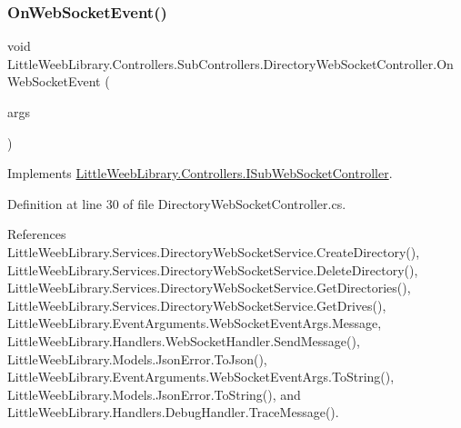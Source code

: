 \subsubsection{\texorpdfstring{On\+Web\+Socket\+Event()}{OnWebSocketEvent()}}
{\footnotesize\ttfamily void Little\+Weeb\+Library.\+Controllers.\+Sub\+Controllers.\+Directory\+Web\+Socket\+Controller.\+On\+Web\+Socket\+Event (\begin{DoxyParamCaption}\item[{\mbox{\hyperlink{class_little_weeb_library_1_1_event_arguments_1_1_web_socket_event_args}{Web\+Socket\+Event\+Args}}}]{args }\end{DoxyParamCaption})}



Implements \mbox{\hyperlink{interface_little_weeb_library_1_1_controllers_1_1_i_sub_web_socket_controller_adcb26b7b397d6a67ccbf114008c29985}{Little\+Weeb\+Library.\+Controllers.\+I\+Sub\+Web\+Socket\+Controller}}.



Definition at line 30 of file Directory\+Web\+Socket\+Controller.\+cs.



References Little\+Weeb\+Library.\+Services.\+Directory\+Web\+Socket\+Service.\+Create\+Directory(), Little\+Weeb\+Library.\+Services.\+Directory\+Web\+Socket\+Service.\+Delete\+Directory(), Little\+Weeb\+Library.\+Services.\+Directory\+Web\+Socket\+Service.\+Get\+Directories(), Little\+Weeb\+Library.\+Services.\+Directory\+Web\+Socket\+Service.\+Get\+Drives(), Little\+Weeb\+Library.\+Event\+Arguments.\+Web\+Socket\+Event\+Args.\+Message, Little\+Weeb\+Library.\+Handlers.\+Web\+Socket\+Handler.\+Send\+Message(), Little\+Weeb\+Library.\+Models.\+Json\+Error.\+To\+Json(), Little\+Weeb\+Library.\+Event\+Arguments.\+Web\+Socket\+Event\+Args.\+To\+String(), Little\+Weeb\+Library.\+Models.\+Json\+Error.\+To\+String(), and Little\+Weeb\+Library.\+Handlers.\+Debug\+Handler.\+Trace\+Message().


